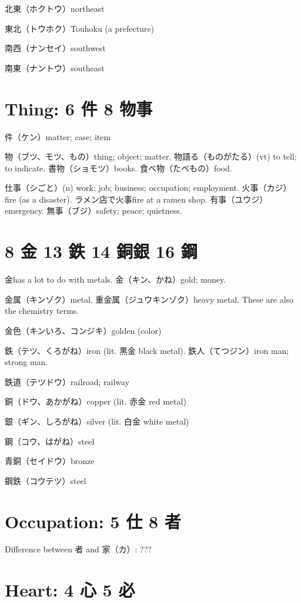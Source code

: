 北東（ホクトウ）northeast

東北（トウホク）Touhoku (a prefecture)

南西（ナンセイ）southwest

南東（ナントウ）southeast

\section{Thing: 6 件 8 物事}

件（ケン）matter; case; item

物（ブツ、モツ、もの）thing; object; matter.
物語る（ものがたる）(vt) to tell; to indicate.
書物（ショモツ）books.
食べ物（たべもの）food.

仕事（シごと）(n) work; job; business; occupation; employment.
火事（カジ）fire (as a disaster).
ラメン店で火事fire at a ramen shop.
有事（ユウジ）emergency.
無事（ブジ）safety; peace; quietness.

\section{8 金 13 鉄 14 銅銀 16 鋼}

金has a lot to do with metals.
金（キン、かね）gold; money.

金属（キンゾク）metal.
重金属（ジュウキンゾク）heavy metal.
These are also the chemistry terms.

金色（キンいろ、コンジキ）golden (color)

鉄（テツ、くろがね）iron (lit. 黒金 black metal).
鉄人（てつジン）iron man; strong man.

鉄道（テツドウ）railroad; railway

銅（ドウ、あかがね）copper (lit. 赤金 red metal)

銀（ギン、しろがね）silver (lit. 白金 white metal)

鋼（コウ、はがね）steel

青銅（セイドウ）bronze

鋼鉄（コウテツ）steel

\section{Occupation: 5 仕 8 者}

Difference between 者 and 家（カ）: ???

\section{Heart: 4 心 5 必}

